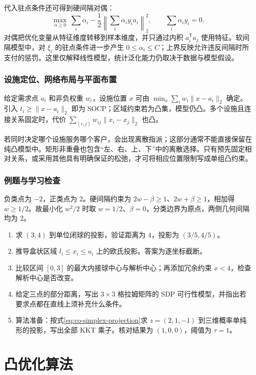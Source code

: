 \documentclass[UTF8,12pt,a4paper,fontset=fandol]{ctexbook}
\begin{document}
代入驻点条件还可得到硬间隔对偶：
\[
 \max_{\alpha\geq0}\
 \sum_i\alpha_i-\frac12\left\|\sum_i\alpha_i y_i a_i\right\|_2^2,
 \qquad \sum_i\alpha_i y_i=0.
\]
对偶把优化变量从特征维度转移到样本维度，并只通过内积 $a_i^{\mathsf T}a_j$ 使用特征。软间隔模型中，对 $\xi_i$ 的驻点条件进一步产生 $0\leq\alpha_i\leq C$；上界反映允许违反间隔时所支付的惩罚。这里仅解释线性模型，统计泛化能力仍取决于数据与模型假设。

\section{设施定位、网络布局与平面布置}

给定需求点 $a_i$ 和非负权重 $w_i$，设施位置 $x$ 可由 $\min_x\sum_iw_i\|x-a_i\|_2$ 确定。引入 $t_i\geq\|x-a_i\|_2$ 即为 SOCP；区域约束若为凸集，模型仍凸。多个设施且连接关系固定时，代价 $\sum_{(i,j)}w_{ij}\|x_i-x_j\|_2$ 也凸。

若同时决定哪个设施服务哪个客户，会出现离散指派；这部分通常不能直接保留在纯凸模型中。矩形非重叠也包含“左、右、上、下”中的离散选择。只有预先固定相对关系，或采用其他具有明确保证的松弛，才可将相应位置限制写成单组凸约束。

\section{例题与学习检查}
\begin{example}[一维最大间隔]
负类点为 $-2$，正类点为 $2$。硬间隔约束为 $2w-\beta\geq1$、$2w+\beta\geq1$，相加得 $w\geq1/2$。故最小化 $w^2/2$ 时取 $w=1/2$、$\beta=0$，分类边界为原点，两侧几何间隔均为 $2$。
\end{example}
\begin{enumerate}
 \item 求 $(3,4)$ 到单位闭球的投影，验证距离为 $4$，投影为 $(3/5,4/5)$。
 \item 推导盒状区域 $l_i\leq x_i\leq u_i$ 上的欧氏投影。答案为逐坐标截断。
 \item 比较区间 $[0,3]$ 的最大内接球中心与解析中心；再添加冗余约束 $x<4$，检查解析中心是否改变。
 \item 给定三点的部分距离，写出 $3\times3$ 格拉姆矩阵的 SDP 可行性模型，并指出若要求点都在直线上须补充什么条件。
 \item 算法准备：按式\eqref{eq:co-simplex-projection}求 $z=(2,1,-1)$ 到三维概率单纯形的投影，写出全部 KKT 乘子。核对结果为 $(1,0,0)$，阈值为 $\tau=1$。
\end{enumerate}

\part{凸优化算法}
\end{document}
